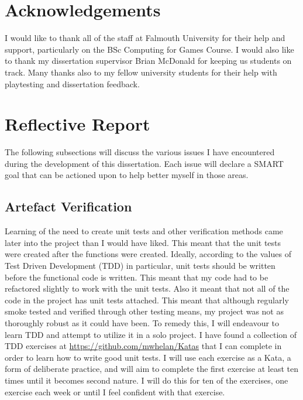 \documentclass[journal]{IEEEtran}
\begin{document}
\section{Acknowledgements}
I would like to thank all of the staff at Falmouth University for their help and support, particularly on the BSc Computing for Games Course. I would also like to thank my dissertation supervisor Brian McDonald for keeping us students on track. Many thanks also to my fellow university students for their help with playtesting and dissertation feedback.

\newpage



\newpage
\appendices


\section{Reflective Report}
The following subsections will discuss the various issues I have encountered during the development of this dissertation. Each issue will declare a SMART goal that can be actioned upon to help better myself in those areas.

\subsection{Artefact Verification}
Learning of the need to create unit tests and other verification methods came later into the project than I would have liked. This meant that the unit tests were created after the functions were created. Ideally, according to the values of Test Driven Development (TDD) in particular, unit tests should be written before the functional code is written. This meant that my code had to be refactored slightly to work with the unit tests. Also it meant that not all of the code in the project has unit tests attached. This meant that although regularly smoke tested and verified through other testing means, my project was not as thoroughly robust as it could have been.
To remedy this, I will endeavour to learn TDD and attempt to utilize it in a solo project. I have found a collection of TDD exercises at \url{https://github.com/mwhelan/Katas} that I can complete in order to learn how to write good unit tests. I will use each exercise as a Kata, a form of deliberate practice, and will aim to complete the first exercise at least ten times until it becomes second nature. I will do this for ten of the exercises, one exercise each week or until I feel confident with that exercise.
\end{document}
